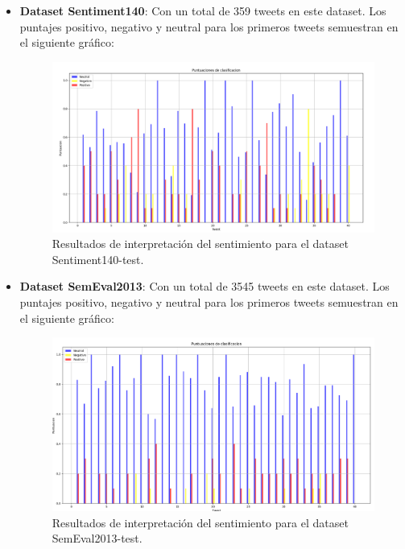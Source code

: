 \documentclass[sigconf, review=false, nonacm]{acmart}
\begin{document}
	\begin{itemize}
		\item \textbf{Dataset Sentiment140}: Con un total de 359 tweets en este dataset.
		Los puntajes positivo, negativo y neutral para los primeros tweets semuestran en el siguiente gráfico:
		\begin{figure}[ht]
			\centering
			\includegraphics[width=\linewidth]{../results/barras/sentiment140.png}
			\caption{Resultados de interpretación del sentimiento para el dataset Sentiment140-test.}
			\label{fig:sentiment140}
		\end{figure}

		\item \textbf{Dataset SemEval2013}: Con un total de 3545 tweets en este dataset.
		Los puntajes positivo, negativo y neutral para los primeros tweets semuestran en el siguiente gráfico:
		\begin{figure}[ht]
			\centering
			\includegraphics[width=\linewidth]{../results/barras/semeval2013.png}
			\caption{Resultados de interpretación del sentimiento para el dataset SemEval2013-test.}
			\label{fig:semeval2013}
		\end{figure}


\end{itemize}
\end{document}
